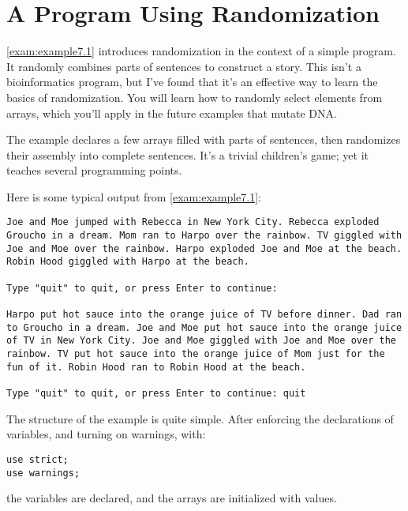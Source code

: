 \section{A Program Using Randomization}
\autoref{exam:example7.1} introduces randomization in the context of a simple program. It randomly combines parts of sentences to construct a story. This isn't a bioinformatics program, but I've found that it's an effective way to learn the basics of randomization. You will learn how to randomly select elements from arrays, which you'll apply in the future examples that mutate DNA.

The example declares a few arrays filled with parts of sentences, then randomizes their assembly into complete sentences. It's a trivial children's game; yet it teaches several programming points.



Here is some typical output from \autoref{exam:example7.1}:

\begin{lstlisting}[breaklines=true]
Joe and Moe jumped with Rebecca in New York City. Rebecca exploded Groucho in a dream. Mom ran to Harpo over the rainbow. TV giggled with Joe and Moe over the rainbow. Harpo exploded Joe and Moe at the beach. Robin Hood giggled with Harpo at the beach. 

Type "quit" to quit, or press Enter to continue: 

Harpo put hot sauce into the orange juice of TV before dinner. Dad ran to Groucho in a dream. Joe and Moe put hot sauce into the orange juice of TV in New York City. Joe and Moe giggled with Joe and Moe over the rainbow. TV put hot sauce into the orange juice of Mom just for the fun of it. Robin Hood ran to Robin Hood at the beach. 

Type "quit" to quit, or press Enter to continue: quit
\end{lstlisting}

The structure of the example is quite simple. After enforcing the declarations of variables, and turning on warnings, with:

\begin{lstlisting}
use strict;
use warnings;
\end{lstlisting}

the variables are declared, and the arrays are initialized with values. 

